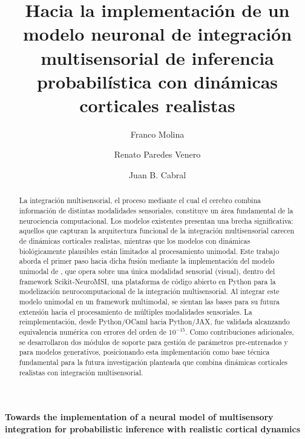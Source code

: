 \documentclass{llncs}
\begin{document}
\title{Hacia la implementación de un modelo neuronal de integración
multisensorial de inferencia probabilística con dinámicas corticales
realistas}

\author{Franco Molina
\and Renato Paredes Venero
\and Juan B. Cabral
}


\maketitle

\renewcommand{\abstractname}{Resumen}
\begin{abstract}
La integración multisensorial, el proceso mediante el cual el
cerebro combina información de distintas modalidades sensoriales,
constituye un área fundamental de la neurociencia computacional. Los
modelos existentes presentan una brecha significativa: aquellos que
capturan la arquitectura funcional de la integración multisensorial
carecen de dinámicas corticales realistas, mientras que los modelos
con dinámicas biológicamente plausibles están limitados al
procesamiento unimodal. Este trabajo aborda el primer paso hacia dicha fusión mediante la
implementación del modelo unimodal de \citet{echeveste2020cortical},
que opera sobre una única modalidad sensorial (visual), dentro del
framework Scikit-NeuroMSI, una plataforma de código abierto en Python
para la modelización neurocomputacional de la integración
multisensorial. Al integrar este modelo unimodal en un framework
multimodal, se sientan las bases para su futura extensión hacia el
procesamiento de múltiples modalidades sensoriales. La
reimplementación, desde Python/OCaml hacia Python/JAX, fue validada
alcanzando equivalencia numérica con errores del orden de
$10^{-15}$. Como contribuciones adicionales, se
desarrollaron dos módulos de soporte para gestión de parámetros
pre-entrenados y para modelos generativos, posicionando esta
implementación como base técnica fundamental para la futura
investigación planteada que combina dinámicas corticales realistas
con integración multisensorial.
\end{abstract}

\begin{center}
\Large\bfseries
Towards the implementation of a neural model of multisensory
integration for probabilistic inference with realistic cortical
dynamics
\end{center}
\end{document}
